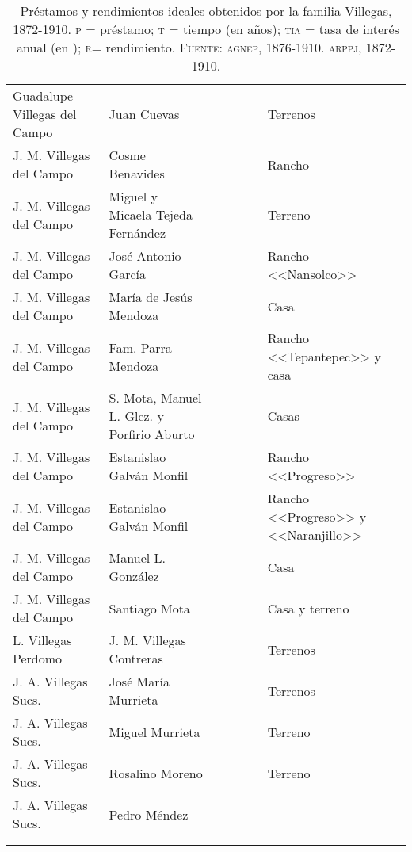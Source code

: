 \documentclass[14pt,twoside,final]{extbook} %
\begin{document}
{\begin{longtable}[c]{@{}p{2.5cm}lrSrrl@{}}
Guadalupe Villegas del Campo & Juan Cuevas &  &  & {} & {} & Terrenos \\
J. M. Villegas del Campo & Cosme Benavides &  &  &  &  & Rancho \\
J. M. Villegas del Campo & Miguel y Micaela Tejeda Fernández &  & {} & {} & {} & Terreno \\
J. M. Villegas del Campo & José Antonio García &  &  &  &  & Rancho <<Nansolco>> \\
J. M. Villegas del Campo & María de Jesús Mendoza &  &  &  &  & Casa \\
J. M. Villegas del Campo & Fam. Parra-Mendoza &  &  &  &  & Rancho <<Tepantepec>> y casa \\
J. M. Villegas del Campo & S. Mota, Manuel L. Glez. y Porfirio Aburto &  &  &  &  & Casas \\
J. M. Villegas del Campo & Estanislao Galván Monfil &  &  & {} & {} & Rancho <<Progreso>> \\
J. M. Villegas del Campo & Estanislao Galván Monfil &  & {} & {} & {} & Rancho <<Progreso>> y <<Naranjillo>> \\
J. M. Villegas del Campo & Manuel L. González &  &  &  &  & Casa \\
J. M. Villegas del Campo & Santiago Mota &  &  &  &  & Casa y terreno \\
L. Villegas Perdomo & J. M. Villegas Contreras &  & {} & {} & {} & Terrenos \\
J. A. Villegas Sucs. & José María Murrieta &  &  &  &  & Terrenos \\
J. A. Villegas Sucs. & Miguel Murrieta &  & {} & {} & {} & Terreno \\
J. A. Villegas Sucs. & Rosalino Moreno &  & {} & {} & {} & Terreno \\
J. A. Villegas Sucs. & Pedro Méndez &  & {} & {} & {} & {} \\
{} & {} &  & {} & {} &  & {} \\
\caption[Préstamos y rendimientos ideales obtenidos por la familia Villegas, 1872-1910]{Préstamos y rendimientos ideales obtenidos por la familia Villegas, 1872-1910.  \textsc{p} = préstamo;  \textsc{t} = tiempo (en años);  \textsc{tia} = tasa de interés anual (en );  \textsc{r}= rendimiento. \textsc{Fuente:} \textsc{agnep}, 1876-1910. \textsc{arppj}, 1872-1910.}
\label{tab:prestamos-y-rendimientos}
\end{longtable}
}%
\end{document}
